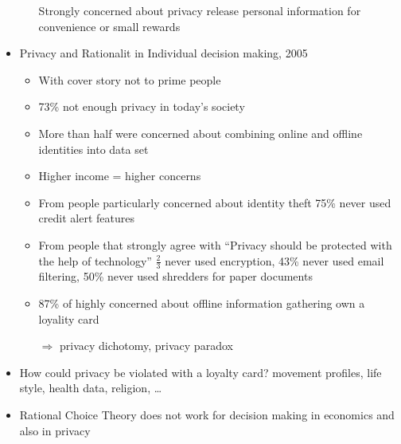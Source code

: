 \documentclass[a4paper,12pt]{scrartcl}
\begin{document}
\begin{itemize}
\begin{itemize}
				Strongly concerned about privacy release personal information for convenience or small rewards
		\end{itemize}
	\item
		Privacy and Rationalit in Individual decision making, 2005
		\begin{itemize}
			\item
				With cover story not to prime people
			\item
				73\% not enough privacy in today's society
			\item
				More than half were concerned about combining online and offline identities into data set
			\item
				Higher income = higher concerns
			\item
				From people particularly concerned about identity theft 75\% never used credit alert features
			\item
				From people that strongly agree with \enquote{Privacy should be protected with the help of technology} $\frac23$ never used encryption, 43\% never used email filtering, 50\% never used shredders for paper documents
			\item
				87\% of highly concerned about offline information gathering own  a loyality card
			\item[$\Rightarrow$] privacy dichotomy, privacy paradox
		\end{itemize}
	\item
		How could privacy be violated with a loyalty card? movement profiles, life style, health data, religion, \dots
	\item
		Rational Choice Theory does not work for decision making in economics and also in privacy


\end{itemize}
\end{document}
